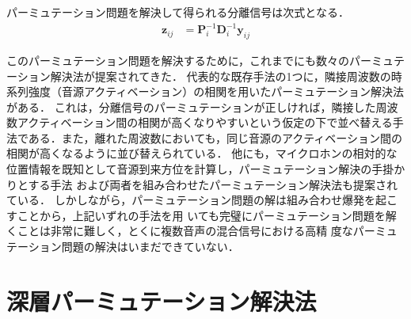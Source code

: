 パーミュテーション問題を解決して得られる分離信号は次式となる．
\begin{align}
\bm{z}_{ij} &= \bm{P}_{i}^{-1}\bm{D}_{i}^{-1}\bm{y}_{ij} \label{eq:z}
\end{align}

このパーミュテーション問題を解決するために，これまでにも数々のパーミュテーション解決法が提案されてきた．
代表的な既存手法の1つに，隣接周波数の時系列強度（音源アクティベーション）の相関を用いたパーミュテーション解決法\cite{COR}がある．
これは，分離信号のパーミュテーションが正しければ，隣接した周波数アクティベーション間の相関が高くなりやすいという仮定の下で並べ替える手法である．また，離れた周波数においても，同じ音源のアクティベーション間の相関が高くなるように並び替えられている．
他にも，マイクロホンの相対的な位置情報を既知として音源到来方位を計算し，パーミュテーション解決の手掛かりとする手法 \cite{DOA}および両者を組み合わせたパーミュテーション解決法も提案されている．
しかしながら，パーミュテーション問題の解は組み合わせ爆発を起こすことから，上記いずれの手法を用
いても完璧にパーミュテーション問題を解くことは非常に難しく，とくに複数音声の混合信号における高精
度なパーミュテーション問題の解決はいまだできていない．

\section{深層パーミュテーション解決法}
\label{sec:ivailrma}

